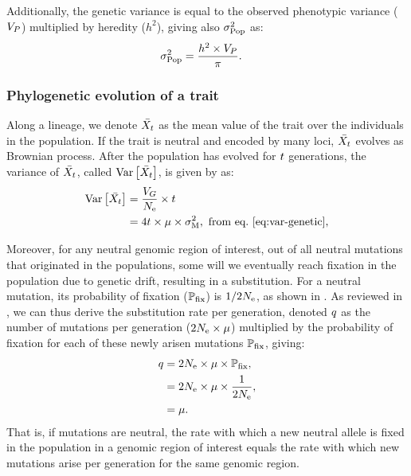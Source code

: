 \documentclass{article}
\begin{document}
Additionally, the genetic variance is equal to the observed phenotypic variance ($V_{P}$) multiplied by heredity ($h^2$), giving also $\sigma^2_{\text{Pop}}$ as:
\begin{align}
    \sigma^2_{\text{Pop}} & = \frac{h^2 \times V_{P} }{\pi }. \label{eq:rate-pheno-pop}
\end{align}

\subsubsection{Phylogenetic evolution of a trait}

Along a lineage, we denote $\bar{X_{t}}$ as the mean value of the trait over the individuals in the population.
If the trait is neutral and encoded by many loci, $\bar{X_{t}}$ evolves as Brownian process\cite{hansen_translating_1996}.
After the population has evolved for $t$ generations, the variance of $\bar{X_{t}}$, called $\operatorname{\text{Var}} \left[\bar{X_{t}}\right]$, is given by \textcite{hansen_translating_1996} as:
\begin{align}
    \operatorname{\text{Var}} \left[\bar{X_{t}}\right] & = \frac{V_{G}}{N_{\text{e}}} \times t \\
    & = 4 t \times \mu \times \sigma^2_{\text{M}} \label{eq:covar},\text{ from eq.~\ref{eq:var-genetic}},
\end{align}

Moreover, for any neutral genomic region of interest, out of all neutral mutations that originated in the populations, some will we eventually reach fixation in the population due to genetic drift, resulting in a substitution.
For a neutral mutation, its probability of fixation ($\mathbb{P}_{\text{fix}}$) is $1/2N_{\text{e}}$, as shown in \textcite{kimura_probability_1962}.
As reviewed in \textcite{mccandlish_modeling_2014}, we can thus derive the substitution rate per generation, denoted $q$ as the number of mutations per generation ($2N_{\text{e}} \times \mu$) multiplied by the probability of fixation for each of these newly arisen mutations $\mathbb{P}_{\text{fix}}$, giving:
\begin{align}
    q & = 2 N_{\text{e}} \times \mu \times \mathbb{P}_{\text{fix}}, \\
    & = 2 N_{\text{e}}  \times \mu  \times \dfrac{1}{2N_{\text{e}}}, \\
    & = \mu. \label{eq:substitution-rate}
\end{align}
That is, if mutations are neutral, the rate with which a new neutral allele is fixed in the population in a genomic region of interest equals the rate with which new mutations arise per generation for the same genomic region\cite{kimura_evolutionary_1968}.
\end{document}
